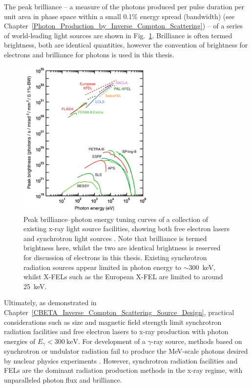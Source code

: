 \documentclass[../main.tex]{subfiles}
\begin{document}
The peak brilliance -- a measure of the photons produced per pulse duration per unit area in phase space within a small 0.1\% energy spread (bandwidth) (see Chapter~\ref{Photon_Production_by_Inverse_Compton_Scattering}) -- of a series of world-leading light sources are shown in Fig.~\ref{fig:light_source_tuning_curves}. Brilliance is often termed brightness, both are identical quantities, however the convention of brightness for electrons and brilliance for photons is used in this thesis. 
\begin{figure}[!h]
\centering
\includegraphics[width=0.6\textwidth]{Figures/Introduction/Light_Source_Brilliance_Energy.pdf}
\caption{Peak brilliance--photon energy tuning curves of a collection of existing x-ray light source facilities, showing both free electron lasers and synchrotron light sources \cite{geloni2017physics}. Note that brilliance is termed brightness here, whilst the two are identical brightness is reserved for discussion of electrons in this thesis. Existing synchrotron radiation sources appear limited in photon energy to $\sim 300$~\si{\kilo\electronvolt}, whilst X-FELs such as the European X-FEL \cite{schneidmiller2011photon} are limited to around 25~\si{\kilo\electronvolt}.}
\label{fig:light_source_tuning_curves}
\end{figure}

Ultimately, as demonstrated in Chapter~\ref{CBETA_Inverse_Compton_Scattering_Source_Design}, practical considerations such as size and magnetic field strength limit synchrotron radiation facilities and free electron lasers to x-ray production with photon energies of $E_{\gamma} < 300~\si{\kilo\electronvolt}$. For development of a $\gamma$-ray source, methods based on synchrotron or undulator radiation fail to produce the \si{\mega\electronvolt}-scale photons desired by nuclear physics experiments \cite{budker2021expanding}. However, synchrotron radiation facilities and FELs are the dominant radiation production methods in the x-ray regime, with unparalleled photon flux and brilliance.  
\end{document}
